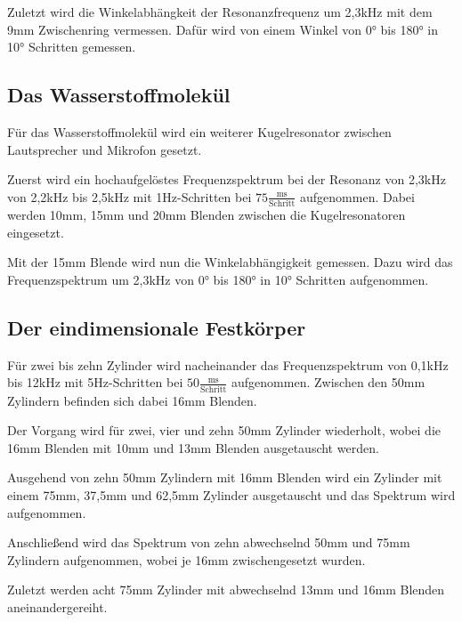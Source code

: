 \noindent
Zuletzt wird die Winkelabhängkeit der Resonanzfrequenz um 2,3kHz mit dem 9mm Zwischenring vermessen.
Dafür wird von einem Winkel von 0° bis 180° in 10° Schritten gemessen.

\subsection{Das Wasserstoffmolekül}
\noindent
Für das Wasserstoffmolekül wird ein weiterer Kugelresonator zwischen Lautsprecher und Mikrofon gesetzt.

\noindent
Zuerst wird ein hochaufgelöstes Frequenzspektrum bei der Resonanz von 2,3kHz von 2,2kHz bis 2,5kHz mit 1Hz-Schritten bei $75\frac{\text{ms}}{\text{Schritt}}$ aufgenommen.
Dabei werden 10mm, 15mm und 20mm Blenden zwischen die Kugelresonatoren eingesetzt.

\noindent
Mit der 15mm Blende wird nun die Winkelabhängigkeit gemessen.
Dazu wird das Frequenzspektrum um 2,3kHz von 0° bis 180° in 10° Schritten aufgenommen.

\subsection{Der eindimensionale Festkörper}

\noindent
Für zwei bis zehn Zylinder wird nacheinander das Frequenzspektrum von 0,1kHz bis 12kHz mit 5Hz-Schritten bei $50\frac{\text{ms}}{\text{Schritt}}$ aufgenommen.
Zwischen den 50mm Zylindern befinden sich dabei 16mm Blenden.

\noindent
Der Vorgang wird für zwei, vier und zehn 50mm Zylinder wiederholt, wobei die 16mm Blenden mit 10mm und 13mm Blenden ausgetauscht werden.

\noindent
Ausgehend von zehn 50mm Zylindern mit 16mm Blenden wird ein Zylinder mit einem 75mm, 37,5mm und 62,5mm Zylinder ausgetauscht und das Spektrum wird aufgenommen.

\noindent
Anschließend wird das Spektrum von zehn abwechselnd 50mm und 75mm Zylindern aufgenommen, wobei je 16mm zwischengesetzt wurden.

\noindent
Zuletzt werden acht 75mm Zylinder mit abwechselnd 13mm und 16mm Blenden aneinandergereiht.




